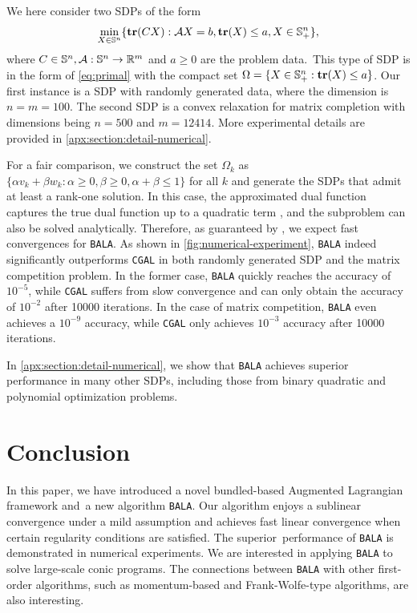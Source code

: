 \documentclass[11pt]{article}
\newcommand{\alg}{\texttt{BALA}}%
\newcommand{\CGAL}{\texttt{CGAL}}
\begin{document}
We here consider two SDPs of the form
\begin{align*}
    \min_{X \in \mathbb{S}^n} \{ \mathop{\bf tr}(CX) : \mathcal{A} X = b, \mathop{\bf tr}(X) \leq a ,X \in \mathbb{S}^n_+\},
\end{align*}
where $C \in \mathbb{S}^n, \mathcal{A} : \mathbb{S}^n \to \mathbb{R}^m$ and $ a \geq 0$ are the problem data.~This type of SDP is in the form of \eqref{eq:primal} with the compact set $\Omega = \{ X \in \mathbb{S}^n_+ : \mathop{\bf tr}(X) \leq a \}$. Our first instance is a SDP  with randomly generated data, where the dimension is $n=m=100$. The second SDP is a convex relaxation for matrix completion \cite{candes2012exact} with dimensions being $n = 500$ and $m = 12414$. More experimental details are provided in \cref{apx:section:detail-numerical}.

For a fair comparison, we construct the set $\Omega_{k}$ as $ \{ \alpha v_{k} + \beta w_{k} : \alpha \geq 0, \beta \geq 0, \alpha + \beta \leq 1 \}$ for all $k$ and generate the SDPs that admit at least a rank-one solution. 
In this case, the approximated dual function captures the true dual function up to a quadratic term \cite{ding2023revisiting,liao2023overview}, and the subproblem can also be solved analytically. Therefore, as guaranteed by , we expect fast convergences for \alg{}. 
%
As shown in \cref{fig:numerical-experiment}, \alg{} indeed significantly outperforms \CGAL{} in both randomly generated SDP and the matrix competition problem. In the former case, \alg{} quickly reaches the accuracy of $10^{-5}$, while \CGAL{} suffers from slow convergence and can only obtain the accuracy of $10^{-2}$ after 10000 iterations. 
In the case of matrix competition, \alg{} even achieves a $10^{-9}$ accuracy, while \CGAL{} only achieves $10^{-3}$ accuracy after 10000 iterations. 

In \cref{apx:section:detail-numerical}, we show that \alg{} achieves superior performance in many other SDPs, including those from binary quadratic and polynomial optimization problems. 

\section{Conclusion}
\label{section:conclusion} \vspace{-1mm}
In this paper, we have introduced a novel bundled-based Augmented Lagrangian framework and~a new algorithm  \alg{}. Our algorithm enjoys a sublinear convergence under a mild assumption and achieves fast linear convergence when certain regularity conditions are satisfied. The superior~performance of \alg{} is demonstrated in numerical experiments. We are interested in applying \alg{} to solve large-scale conic programs. The connections between \alg{} with other first-order algorithms, such as momentum-based and Frank-Wolfe-type algorithms, are also interesting.   
\end{document}
